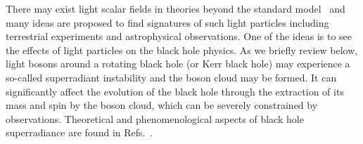 \documentclass[%
 preprint,
 nofootinbib,
 amsmath,amssymb,
 aps,
 a4paper
]{revtex4-1}
\begin{document}
There may exist light scalar fields in theories beyond the standard model~\cite{Arvanitaki:2009fg} and many ideas are proposed to find signatures of such light particles including terrestrial experiments and astrophysical observations. 
One of the ideas is to see the effects of light particles on the black hole physics. As we briefly review below, light bosons around a rotating black hole (or Kerr black hole) may experience a so-called superradiant instability and the boson cloud may be formed. 
It can significantly affect the evolution of the black hole through the extraction of its mass and spin by the boson cloud, which can be severely constrained by observations. 
Theoretical and phenomenological aspects of black hole superradiance are found in Refs.~\cite{Press:1972zz,Bekenstein:1973mi,Damour:1976kh,Zouros:1979iw,Detweiler:1980uk,Furuhashi:2004jk,Dolan:2007mj,Rosa:2009ei,Arvanitaki:2010sy,Rosa:2011my,Yoshino:2012kn,Pani:2012vp,Pani:2012bp,Dolan:2012yt,Pani:2013hpa,Yoshino:2013ofa,Arvanitaki:2014wva,Brito:2014wla,Brito:2015oca,Endlich:2016jgc,East:2017ovw,Baryakhtar:2017ngi,Cardoso:2018tly,Baumann:2018vus,Dolan:2018dqv,East:2018glu,Baumann:2019eav}.
\end{document}
